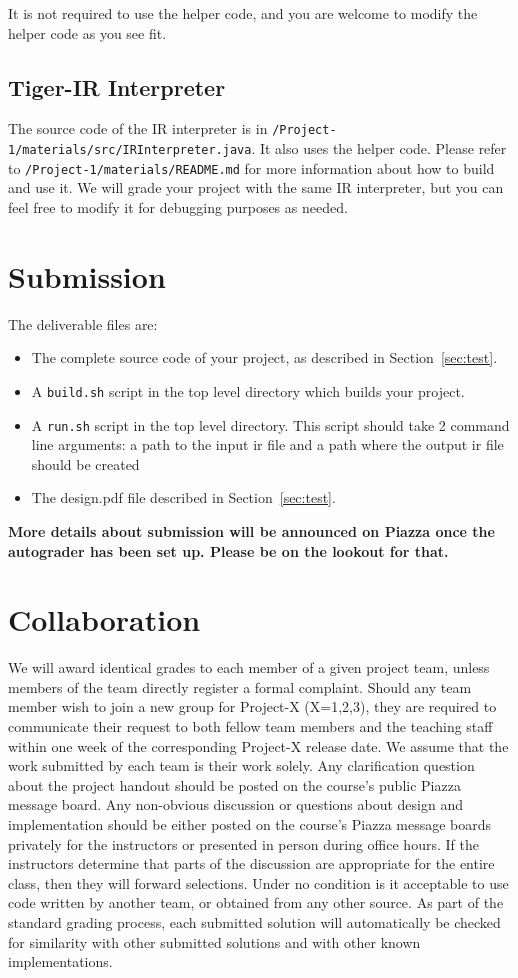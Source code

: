 \documentclass[12pt]{article}
\begin{document}
It is not required to use the helper code, and you are welcome to
modify the helper code as you see fit.

\subsection{Tiger-IR Interpreter}

The source code of the IR interpreter is in \texttt{/Project-1/materials/src/IRInterpreter.java}.
It also uses the helper code.
Please refer to \texttt{/Project-1/materials/README.md} for more information about how to build and use it.
We will grade your project with the same IR interpreter, but you can
feel free to modify it for debugging purposes as needed.

\section{Submission}

The deliverable files are:
\begin{itemize}
    \item The complete source code of your project, as described in Section~\ref{sec:test}.
    \item A \texttt{build.sh} script in the top level directory which builds your project.
    \item A \texttt{run.sh} script in the top level directory. This script should take 2 command line arguments: a path to the input ir file and a path where the output ir file should be created

    \item The design.pdf file described in Section~\ref{sec:test}.
\end{itemize}

\textbf{More details about submission will be announced on Piazza once the autograder has been set up. Please be on the lookout for that.}

\section{Collaboration}
%
We will award identical grades to each member of a given project team, unless members of the team directly register a formal complaint. Should any team member wish to join a new group for Project-X (X=1,2,3), they are required to communicate their request to both fellow team members and the teaching staff within one week of the corresponding Project-X release date.
%
We assume that the work submitted by each team is their work solely.
% 
Any clarification question about the project handout should be posted
on the course's public Piazza message
board.
%
Any non-obvious discussion or questions about design and
implementation should be either posted on the course's Piazza message
boards privately for the instructors or presented in person during
office hours.
%
If the instructors determine that parts of the discussion are
appropriate for the entire class, then they will forward selections.
%
Under no condition is it acceptable to use code written by another
team, or obtained from any other source.
%
As part of the standard grading process, each submitted solution will
automatically be checked for similarity with other submitted solutions and with other known
implementations.
\end{document}
